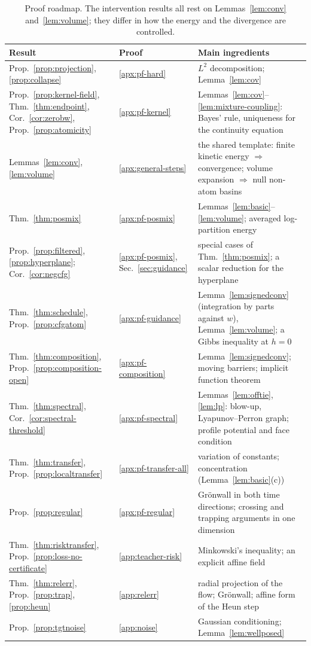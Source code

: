 \documentclass{article} %
\theoremstyle{plain}
\theoremstyle{definition}
\theoremstyle{remark}
\begin{document}
\begin{table}[h]
\centering\small
\begin{tabular}{@{}p{}p{}p{}@{}}
\toprule
Result & Proof & Main ingredients\\
\midrule
Prop.~\ref{prop:projection}, \ref{prop:collapse} & \ref{apx:pf-hard} & $L^2$ decomposition; Lemma~\ref{lem:cov}\\
Prop.~\ref{prop:kernel-field}, Thm.~\ref{thm:endpoint}, Cor.~\ref{cor:zerobw}, Prop.~\ref{prop:atomicity} & \ref{apx:pf-kernel} & Lemmas~\ref{lem:cov}--\ref{lem:mixture-coupling}: Bayes' rule, uniqueness for the continuity equation\\
\addlinespace
Lemmas~\ref{lem:conv}, \ref{lem:volume} & \ref{apx:general-steps} & the shared template: finite kinetic energy $\Rightarrow$ convergence; volume expansion $\Rightarrow$ null non-atom basins\\
Thm.~\ref{thm:posmix} & \ref{apx:pf-posmix} & Lemmas~\ref{lem:basic}--\ref{lem:volume}; averaged log-partition energy\\
Prop.~\ref{prop:filtered}, \ref{prop:hyperplane}; Cor.~\ref{cor:negcfg} & \ref{apx:pf-posmix}, Sec.~\ref{sec:guidance} & special cases of Thm.~\ref{thm:posmix}; a scalar reduction for the hyperplane\\
Thm.~\ref{thm:schedule}, Prop.~\ref{prop:cfgatom} & \ref{apx:pf-guidance} & Lemma~\ref{lem:signedconv} (integration by parts against $w$), Lemma~\ref{lem:volume}; a Gibbs inequality at $h=0$\\
Thm.~\ref{thm:composition}, Prop.~\ref{prop:composition-open} & \ref{apx:pf-composition} & Lemma~\ref{lem:signedconv}; moving barriers; implicit function theorem\\
Thm.~\ref{thm:spectral}, Cor.~\ref{cor:spectral-threshold} & \ref{apx:pf-spectral} & Lemmas~\ref{lem:offtie}, \ref{lem:lp}: blow-up, Lyapunov--Perron graph; profile potential and face condition\\
\addlinespace
Thm.~\ref{thm:transfer}, Prop.~\ref{prop:localtransfer} & \ref{apx:pf-transfer-all} & variation of constants; concentration (Lemma~\ref{lem:basic}(c))\\
Prop.~\ref{prop:regular} & \ref{apx:pf-regular} & Gr\"onwall in both time directions; crossing and trapping arguments in one dimension\\
Thm.~\ref{thm:risktransfer}, Prop.~\ref{prop:loss-no-certificate} & \ref{app:teacher-risk} & Minkowski's inequality; an explicit affine field\\
Thm.~\ref{thm:relerr}, Prop.~\ref{prop:trap}, \ref{prop:heun} & \ref{app:relerr} & radial projection of the flow; Gr\"onwall; affine form of the Heun step\\
Prop.~\ref{prop:tgtnoise} & \ref{app:noise} & Gaussian conditioning; Lemma~\ref{lem:wellposed}\\
\bottomrule
\end{tabular}
\caption{Proof roadmap. The intervention results all rest on Lemmas~\ref{lem:conv}
and~\ref{lem:volume}; they differ in how the energy and the divergence are controlled.}
\label{tab:roadmap}
\end{table}
\end{document}

